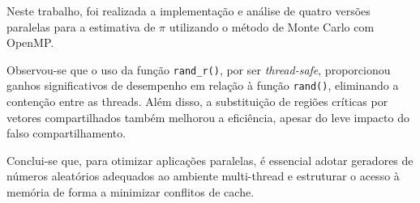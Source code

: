 \documentclass[a4paper, 12pt]{article}
\begin{document}
	Neste trabalho, foi realizada a implementação e análise de quatro versões paralelas para a estimativa de $\pi$ utilizando o método de Monte Carlo com OpenMP.
	
	Observou-se que o uso da função \texttt{rand\_r()}, por ser \textit{thread-safe}, proporcionou ganhos significativos de desempenho em relação à função \texttt{rand()}, eliminando a contenção entre as threads. Além disso, a substituição de regiões críticas por vetores compartilhados também melhorou a eficiência, apesar do leve impacto do falso compartilhamento.
	
	Conclui-se que, para otimizar aplicações paralelas, é essencial adotar geradores de números aleatórios adequados ao ambiente multi-thread e estruturar o acesso à memória de forma a minimizar conflitos de cache.
	
	
\end{document}
